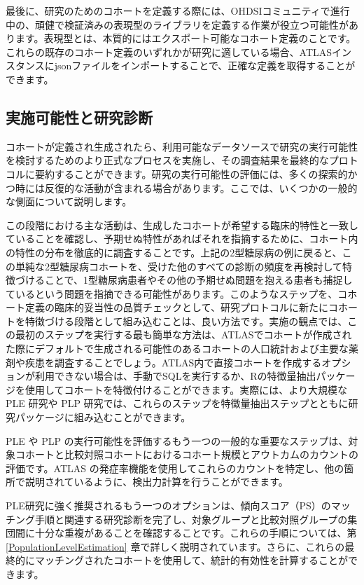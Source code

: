 \documentclass[
  11pt]{book}
\theoremstyle{definition}
\theoremstyle{definition}
\theoremstyle{definition}
\theoremstyle{definition}
\theoremstyle{remark}
\begin{document}
最後に、研究のためのコホートを定義する際には、OHDSIコミュニティで進行中の、頑健で検証済みの表現型のライブラリを定義する作業が役立つ可能性があります。表現型とは、本質的にはエクスポート可能なコホート定義のことです。これらの既存のコホート定義のいずれかが研究に適している場合、ATLASインスタンスにjsonファイルをインポートすることで、正確な定義を取得することができます。

\subsection{実施可能性と研究診断}\label{Feasibility}

 

コホートが定義され生成されたら、利用可能なデータソースで研究の実行可能性を検討するためのより正式なプロセスを実施し、その調査結果を最終的なプロトコルに要約することができます。研究の実行可能性の評価には、多くの探索的かつ時には反復的な活動が含まれる場合があります。ここでは、いくつかの一般的な側面について説明します。

この段階における主な活動は、生成したコホートが希望する臨床的特性と一致していることを確認し、予期せぬ特性があればそれを指摘するために、コホート内の特性の分布を徹底的に調査することです。上記の2型糖尿病の例に戻ると、この単純な2型糖尿病コホートを、受けた他のすべての診断の頻度を再検討して特徴づけることで、1型糖尿病患者やその他の予期せぬ問題を抱える患者も捕捉しているという問題を指摘できる可能性があります。このようなステップを、コホート定義の臨床的妥当性の品質チェックとして、研究プロトコルに新たにコホートを特徴づける段階として組み込むことは、良い方法です。実施の観点では、この最初のステップを実行する最も簡単な方法は、ATLASでコホートが作成された際にデフォルトで生成される可能性のあるコホートの人口統計および主要な薬剤や疾患を調査することでしょう。ATLAS内で直接コホートを作成するオプションが利用できない場合は、手動でSQLを実行するか、Rの特徴量抽出パッケージを使用してコホートを特徴付けることができます。実際には、より大規模な PLE 研究や PLP 研究では、これらのステップを特徴量抽出ステップとともに研究パッケージに組み込むことができます。

PLE や PLP の実行可能性を評価するもう一つの一般的な重要なステップは、対象コホートと比較対照コホートにおけるコホート規模とアウトカムのカウントの評価です。ATLAS の発症率機能を使用してこれらのカウントを特定し、他の箇所で説明されているように、検出力計算を行うことができます。

PLE研究に強く推奨されるもう一つのオプションは、傾向スコア（PS）のマッチング手順と関連する研究診断を完了し、対象グループと比較対照グループの集団間に十分な重複があることを確認することです。これらの手順については、第 \ref{PopulationLevelEstimation} 章で詳しく説明されています。さらに、これらの最終的にマッチングされたコホートを使用して、統計的有効性を計算することができます。
\end{document}
